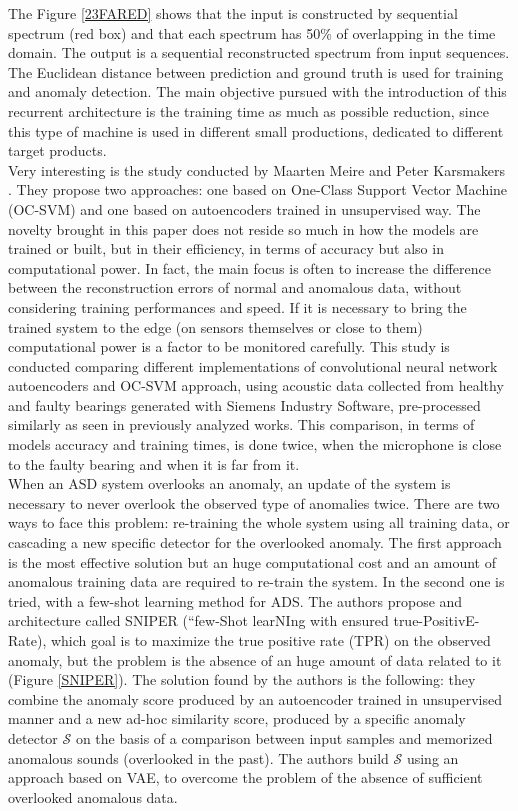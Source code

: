 The Figure \ref{23FARED} shows that the input is constructed by sequential spectrum (red box) and that each spectrum has 50\% of overlapping in the time domain. The output is a sequential reconstructed spectrum from input sequences. The Euclidean distance between prediction and ground truth is used for training and anomaly detection. The main objective pursued with the introduction of this recurrent architecture is the training time as much as possible reduction, since this type of machine is used in different small productions, dedicated to different target products.\\
Very interesting is the study conducted by Maarten Meire and Peter Karsmakers \cite{24ComparisonDeepAutoencodersRealTime}. They propose two approaches: one based on One-Class Support Vector Machine (OC-SVM) and one based on autoencoders trained in unsupervised way. The novelty brought in this paper does not reside so much in how the models are trained or built, but in their efficiency, in terms of accuracy but also in computational power. In fact, the main focus is often to increase the difference between the reconstruction errors of normal and anomalous data, without considering training performances and speed. If it is necessary to bring the trained system to the edge (on sensors themselves or close to them) computational power is a factor to be monitored carefully. This study is conducted comparing different implementations of convolutional neural network autoencoders and OC-SVM approach, using acoustic data collected from healthy and faulty bearings generated with Siemens Industry Software, pre-processed similarly as seen in previously analyzed works. This comparison, in terms of models accuracy and training times, is done twice, when the microphone is close to the faulty bearing and when it is far from it.\\
When an ASD system overlooks an anomaly, an update of the system is necessary to never overlook the observed type of anomalies twice. There are two ways to face this problem: re-training the whole system using all training data, or cascading a new specific detector for the overlooked anomaly. The first approach is the most effective solution but an huge computational cost and an amount of anomalous training data are required to re-train the system. In \cite{25SNIPER} the second one is tried, with a few-shot learning method for ADS. The authors propose and architecture called SNIPER (“few-Shot learNIng with ensured true-PositivE-Rate), which goal is to maximize the true positive rate (TPR) on the observed anomaly, but the problem is the absence of an huge amount of data related to it (Figure \ref{SNIPER}). The solution found by the authors is the following: they combine the anomaly score produced by an autoencoder trained in unsupervised manner and a new ad-hoc similarity score, produced by a specific anomaly detector $\mathcal{S}$ on the basis of a comparison between input samples and memorized anomalous sounds (overlooked in the past). The authors build $\mathcal{S}$ using an approach based on VAE, to overcome the problem of the absence of sufficient overlooked anomalous data.
